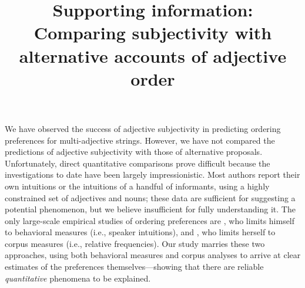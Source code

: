 \documentclass[12pt]{article}
\title{Supporting information: Comparing subjectivity with alternative accounts of adjective order}
\date{}
\begin{document}
\maketitle

We have observed the success of adjective subjectivity in predicting ordering preferences for multi-adjective strings. However, we have not compared the predictions of adjective subjectivity with those of alternative proposals. Unfortunately, direct quantitative comparisons prove difficult because the investigations to date have been largely impressionistic. Most authors report their own intuitions or the intuitions of a handful of informants, using a highly constrained set of adjectives and nouns; these data are sufficient for suggesting a potential phenomenon, but we believe insufficient for fully understanding it. The only large-scale empirical studies of ordering preferences are \citet{martin1969}, who limits himself to behavioral measures (i.e., speaker intuitions), and \citet{wulff2003}, who limits herself to corpus measures (i.e., relative frequencies). Our study marries these two approaches, using both behavioral measures and corpus analyses to arrive at clear estimates of the preferences themselves---showing that there are reliable \emph{quantitative} phenomena to be explained.
\end{document}
